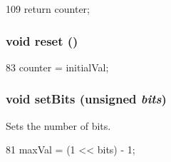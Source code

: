 \begin{DoxyCode}
109     { return counter; }
\end{DoxyCode}
\hypertarget{classSatCounter_ad20897c5c8bd47f5d4005989bead0e55}{
\subsubsection[{reset}]{\setlength{\rightskip}{0pt plus 5cm}void reset ()}}
\label{classSatCounter_ad20897c5c8bd47f5d4005989bead0e55}



\begin{DoxyCode}
83 { counter = initialVal; }
\end{DoxyCode}
\hypertarget{classSatCounter_a1c3a3b06f3b7b6f57bf4bffd65373026}{
\subsubsection[{setBits}]{\setlength{\rightskip}{0pt plus 5cm}void setBits (unsigned {\em bits})}}
\label{classSatCounter_a1c3a3b06f3b7b6f57bf4bffd65373026}
Sets the number of bits. 


\begin{DoxyCode}
81 { maxVal = (1 << bits) - 1; }
\end{DoxyCode}


